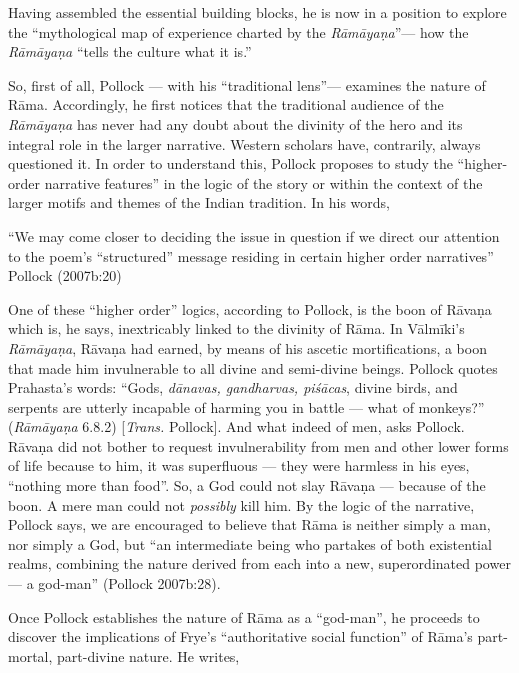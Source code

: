 Having assembled the essential building blocks, he is now in a position to explore the “mythological map of experience charted by the {\sl Rāmāyaṇa}”--- how the {\sl Rāmāyaṇa} “tells the culture what it is.” 

So, first of all, Pollock --- with his “traditional lens”--- examines the nature of Rāma. Accordingly, he first notices that the traditional audience of the {\sl Rāmāyaṇa} has never had any doubt about the divinity of the hero and its integral role in the larger narrative. Western scholars have, contrarily, always questioned it. In order to understand this, Pollock proposes to study the “higher-order narrative features” in the logic of the story or within the context of the larger motifs and themes of the Indian tradition. In his words,

\begin{myquote}
“We may come closer to deciding the issue in question if we direct our attention to the poem’s “structured” message residing in certain higher order narratives”
\hfill Pollock (2007b:20)
\end{myquote}

One of these “higher order” logics, according to Pollock, is the boon of Rāvaṇa which is, he says, inextricably linked to the divinity of Rāma. In Vālmīki’s {\sl Rāmāyaṇa}, Rāvaṇa had earned, by means of his ascetic mortifications, a boon that made him invulnerable to all divine and semi-divine beings.  Pollock quotes Prahasta’s words: “Gods, {\sl dānavas, gandharvas, piśācas}, divine birds, and serpents are utterly incapable of harming you in battle --- what of monkeys?” ({\sl Rāmāyaṇa} 6.8.2) [{\sl Trans.} Pollock]. And what indeed of men, asks Pollock. Rāvaṇa did not bother to request invulnerability from men and other lower forms of life because to him, it was superfluous --- they were harmless in his eyes, “nothing more than food”. So, a God could not slay Rāvaṇa --- because of the boon. A mere man could not {\sl possibly} kill him. By the logic of the narrative, Pollock says, we are encouraged to believe that Rāma is neither simply a man, nor simply a God, but “an intermediate being who partakes of both existential realms, combining the nature derived from each into a new, superordinated power --- a god-man” (Pollock 2007b:28).  

Once Pollock establishes the nature of Rāma as a “god-man”, he proceeds to discover the implications of Frye’s “authoritative social function” of Rāma’s part-mortal, part-divine nature. He writes, 

